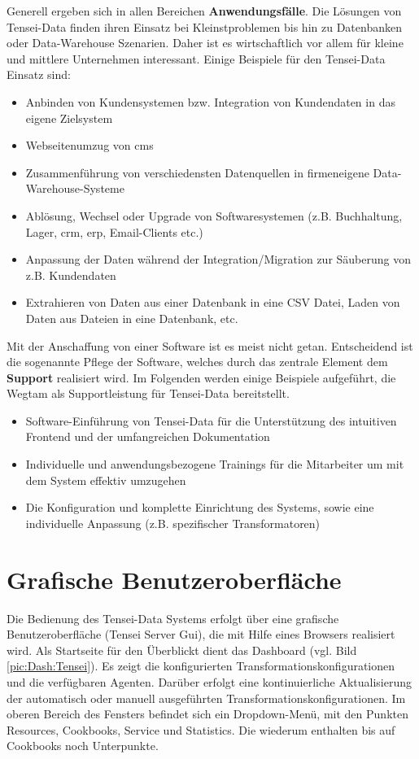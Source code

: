 \newpage
Generell ergeben sich in allen Bereichen \textbf{Anwendungsfälle}. Die Lösungen von Tensei-Data finden ihren Einsatz bei Kleinstproblemen bis hin zu Datenbanken oder Data-Warehouse Szenarien. Daher ist es wirtschaftlich vor allem für kleine und mittlere Unternehmen interessant. \cite{wegtam:use} Einige Beispiele für den Tensei-Data Einsatz sind:
\begin{itemize}
  \item Anbinden von Kundensystemen bzw. Integration von Kundendaten in das eigene Zielsystem
  \item Webseitenumzug von \acrfull{cms}
  \item Zusammenführung von verschiedensten Datenquellen in firmeneigene Data-Warehouse-Systeme
  \item Ablösung, Wechsel oder Upgrade von Softwaresystemen (z.B. Buchhaltung, Lager, \acrfull{crm}, \acrshort{erp}, Email-Clients etc.)
  \item Anpassung der Daten während der Integration/Migration zur Säuberung von z.B. Kundendaten
  \item Extrahieren von Daten aus einer Datenbank in eine CSV Datei, Laden von Daten aus Dateien in eine Datenbank, etc.
\end{itemize}
Mit der Anschaffung von einer Software ist es meist nicht getan. Entscheidend ist die sogenannte Pflege der Software, welches durch das zentrale Element dem \textbf{Support} realisiert wird. Im Folgenden werden einige Beispiele aufgeführt, die Wegtam als Supportleistung für Tensei-Data bereitstellt. \cite{wegtam:supp}
\begin{itemize}
  \item Software-Einführung von Tensei-Data für die Unterstützung des intuitiven Frontend und der umfangreichen Dokumentation
  \item Individuelle und anwendungsbezogene Trainings für die Mitarbeiter um mit dem System effektiv umzugehen
  \item Die Konfiguration und komplette Einrichtung des Systems, sowie eine individuelle Anpassung (z.B. spezifischer Transformatoren)
\end{itemize}

\section{Grafische Benutzeroberfläche}
Die Bedienung des Tensei-Data Systems erfolgt über eine grafische Benutzeroberfläche (Tensei Server Gui), die mit Hilfe eines Browsers realisiert wird. Als Startseite für den Überblickt dient das Dashboard (vgl. Bild \ref{pic:Dash:Tensei}). Es zeigt die konfigurierten Transformationskonfigurationen und die verfügbaren Agenten. Darüber erfolgt eine kontinuierliche Aktualisierung der automatisch oder manuell ausgeführten Transformationskonfigurationen. Im oberen Bereich des Fensters befindet sich ein Dropdown-Menü, mit den Punkten Resources, Cookbooks, Service und Statistics. Die wiederum enthalten bis auf Cookbooks noch Unterpunkte.


